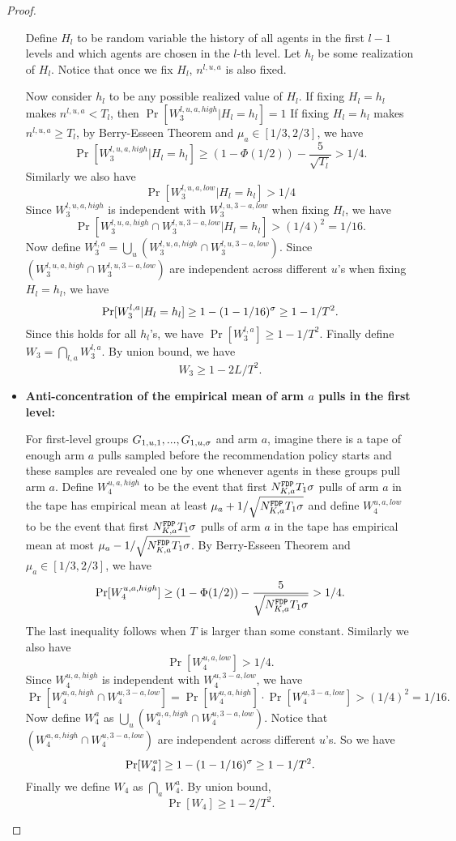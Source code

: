 \begin{proof}
\begin{itemize}
Define $H_l$ to be random variable the history of all agents in the first $l-1$ levels and which agents are chosen in the $l$-th level. Let $h_l$ be some realization of $H_l$. Notice that once we fix $H_l$, $n^{l,u,a}$ is also fixed.

Now consider $h_l$ to be any possible realized value of $H_l$. If fixing $H_l= h_l$ makes $n^{l,u,a}<T_l$, then $\Pr[W_3^{l,u,a,high} |H_l = h_l]=1$  If fixing $H_l = h_l$ makes $n^{l,u,a} \geq T_l$, by Berry-Esseen Theorem and $\mu_a \in [1/3,2/3]$, we have
\[
\Pr[W_3^{l,u,a,high}|H_l = h_l] \geq (1-\Phi(1/2)) - \frac{5}{\sqrt{T_l}} > 1/4.
\]
Similarly we also have
\[
\Pr[W_3^{l,u,a,low}|H_l = h_l]  > 1/4
\]
Since $W_3^{l,u,a,high}$ is independent with $W_3^{l,u,3-a,low}$ when fixing $H_l$, we have
\[
\Pr[ W_3^{l,u,a,high} \cap W_3^{l,u,3-a,low}|H_l = h_l]  > (1/4)^2 = 1/16.
\]
Now define $W_3^{l,a} = \bigcup_u (W_3^{l,u,a,high} \cap W_3^{l,u,3-a,low})$. Since  $(W_3^{l,u,a,high} \cap W_3^{l,u,3-a,low})$ are independent across different $u$'s when fixing $H_l=h_l$, we have
\[
\Pr[W_3^{l,a}|H_l= h_l] \geq 1- (1-1/16)^\sigma \geq 1 - 1/T^2.
\]
Since this holds for all $h_l$'s, we have $\Pr[W_3^{l,a}] \geq 1-1/T^2$. Finally define $W_3 = \bigcap_{l,a} W_3^{l,a}$. By union bound, we have
\[
W_3 \geq 1 - 2L/T^2.
\]

\item \textbf{Anti-concentration of the empirical mean of arm $a$ pulls in the first level:}

For first-level groups $G_{1,u,1},...,G_{1,u,\sigma}$ and arm $a$, imagine there is a tape of enough arm $a$ pulls sampled before the recommendation policy starts and these samples are revealed one by one whenever agents in these groups pull arm $a$. Define $W_4^{u,a,high}$  to be the event that first $N^\mathtt{FDP}_{K,a} T_1 \sigma$ pulls of arm $a$ in the tape has empirical mean at least $\mu_a + 1/\sqrt{N^\mathtt{FDP}_{K,a} T_1 \sigma}$ and define $W_4^{u,a,low}$  to be the event that first $N^\mathtt{FDP}_{K,a} T_1\sigma$ pulls of arm $a$ in the tape has empirical mean at most $\mu_a - 1/\sqrt{N^\mathtt{FDP}_{K,a} T_1\sigma }$. By Berry-Esseen Theorem and $\mu_a \in [1/3,2/3]$, we have
\[
\Pr[W_4^{u,a,high}] \geq (1-\Phi(1/2)) - \frac{5}{\sqrt{N^\mathtt{FDP}_{K,a} T_1\sigma}} > 1/4.
\]
The last inequality follows when $T$ is larger than some constant.
Similarly we also have
\[
\Pr[W_4^{u,a,low}] > 1/4.
\]
Since $W_4^{u,a,high}$ is independent with $W_4^{u,3-a,low}$, we have
\[
\Pr[W_4^{u,a,high} \cap W_4^{u,3-a,low}] =\Pr[W_4^{u,a,high}] \cdot  \Pr[W_4^{u,3-a,low}]>(1/4)^2 = 1/16.
\]
Now define $W^{a}_4$ as $\bigcup_u (W_4^{u,a,high} \cap W_4^{u,3-a,low})$. Notice that $(W_4^{u,a,high} \cap W_4^{u,3-a,low})$ are independent across different $u$'s. So we have
\[
\Pr[W^{a}_4] \geq 1- (1-1/16)^\sigma \geq 1 -1/T^2.
\]
Finally we define $W_4$ as $\bigcap_{a} W^{a}_4$. By union bound,
\[
\Pr[W_4] \geq 1- 2/T^2.
\]
\end{itemize}


\end{proof}
